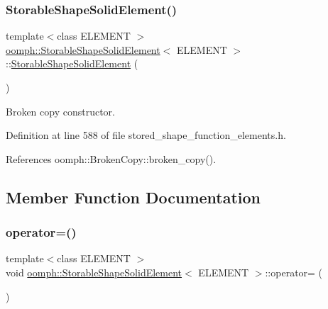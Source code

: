 \subsubsection{\texorpdfstring{Storable\+Shape\+Solid\+Element()}{StorableShapeSolidElement()}\hspace{0.1cm}{\footnotesize\ttfamily [2/2]}}
{\footnotesize\ttfamily template$<$class E\+L\+E\+M\+E\+NT $>$ \\
\hyperlink{classoomph_1_1StorableShapeSolidElement}{oomph\+::\+Storable\+Shape\+Solid\+Element}$<$ E\+L\+E\+M\+E\+NT $>$\+::\hyperlink{classoomph_1_1StorableShapeSolidElement}{Storable\+Shape\+Solid\+Element} (\begin{DoxyParamCaption}\item[{const \hyperlink{classoomph_1_1StorableShapeSolidElement}{Storable\+Shape\+Solid\+Element}$<$ E\+L\+E\+M\+E\+NT $>$ \&}]{ }\end{DoxyParamCaption})\hspace{0.3cm}{\ttfamily [inline]}}



Broken copy constructor. 



Definition at line 588 of file stored\+\_\+shape\+\_\+function\+\_\+elements.\+h.



References oomph\+::\+Broken\+Copy\+::broken\+\_\+copy().



\subsection{Member Function Documentation}
\mbox{\label{classoomph_1_1StorableShapeSolidElement_a14294c89e5870f845215e3f04ef40883}} 
\subsubsection{\texorpdfstring{operator=()}{operator=()}}
{\footnotesize\ttfamily template$<$class E\+L\+E\+M\+E\+NT $>$ \\
void \hyperlink{classoomph_1_1StorableShapeSolidElement}{oomph\+::\+Storable\+Shape\+Solid\+Element}$<$ E\+L\+E\+M\+E\+NT $>$\+::operator= (\begin{DoxyParamCaption}\item[{const \hyperlink{classoomph_1_1StorableShapeSolidElement}{Storable\+Shape\+Solid\+Element}$<$ E\+L\+E\+M\+E\+NT $>$ \&}]{ }\end{DoxyParamCaption})\hspace{0.3cm}{\ttfamily [inline]}}



